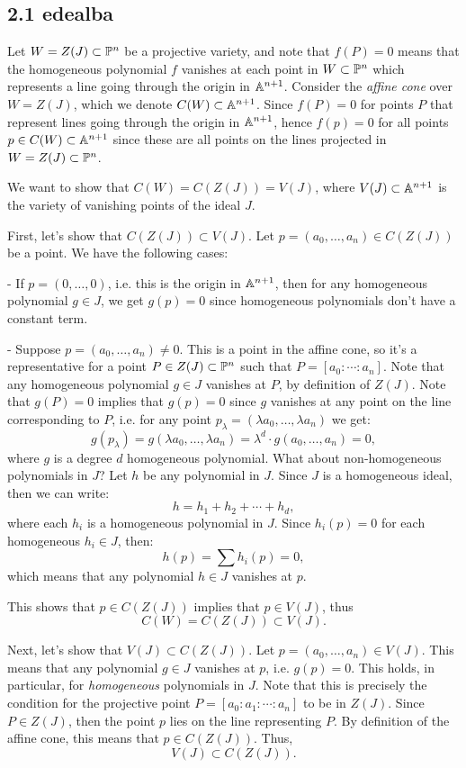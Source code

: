  \subsection*{2.1   {edealba}}

Let $W = Z(J) \subset \P^n$ be a projective variety, and note that $f(P) = 0$ means that the homogeneous polynomial $f$ vanishes at each point in $W \subset \P^n$ which represents a line going through the origin in $\A^{n+1}$. Consider the \emph{affine cone} over $W = Z(J)$, which we denote $C(W) \subset \A^{n+1}$. Since $f(P) = 0$ for points $P$ that represent lines going through the origin in $\A^{n+1}$, hence $f(p) = 0$ for all points $p \in C(W) \subset \A^{n+1}$ since these are all points on the lines projected in $W = Z(J) \subset \P^n$.

We want to show that $C(W) = C(Z(J)) = V(J)$, where $V(J) \subset \A^{n+1}$ is the variety of vanishing points of the ideal $J$.

First, let's show that $C(Z(J)) \subset V(J)$. Let $p = (a_0, \ldots, a_n) \in C(Z(J))$ be a point. We have the following cases:

- If $p = (0, \ldots, 0)$, i.e. this is the origin in $\A^{n+1}$, then for any homogeneous polynomial $g \in J$, we get $g(p) = 0$ since homogeneous polynomials don't have a constant term.

- Suppose $p = (a_0, \ldots, a_n) \neq 0$. This is a point in the affine cone, so it's a representative for a point $P \in Z(J) \subset \P^n$ such that $P = [a_0:\cdots:a_n]$. Note that any homogeneous polynomial $g \in J$ vanishes at $P$, by definition of $Z(J)$. Note that $g(P) = 0$ implies that $g(p) = 0$ since $g$ vanishes at any point on the line corresponding to $P$, i.e. for any point $p_{\lambda} = (\lambda a_0, \ldots, \lambda a_n)$ we get:
$$ g(p_{\lambda}) = g(\lambda a_0, \ldots, \lambda a_n) = \lambda^d \cdot g(a_0, \ldots, a_n) =0, $$
where $g$ is a degree $d$ homogeneous polynomial. What about non-homogeneous polynomials in $J$? Let $h$ be any polynomial in $J$. Since $J$ is a homogeneous ideal, then we can write:
$$ h = h_1 + h_2 + \cdots + h_d, $$
where each $h_i$ is a homogeneous polynomial in $J$. Since $h_i(p) = 0$ for each homogeneous $h_i \in J$, then:
$$ h(p) = \sum h_i(p) = 0, $$
which means that any polynomial $h \in J$ vanishes at $p$.

This shows that $p \in C(Z(J))$ implies that $p \in V(J)$, thus
$$ C(W) = C(Z(J)) \subset V(J). $$

Next, let's show that $V(J) \subset C(Z(J))$. Let $p = (a_0, \ldots, a_n) \in V(J)$. This means that any polynomial $g \in J$ vanishes at $p$, i.e. $g(p) = 0$. This holds, in particular, for \emph{homogeneous} polynomials in $J$. Note that this is precisely the condition for the projective point $P = [a_0: a_1: \cdots : a_n]$ to be in $Z(J)$. Since $P \in Z(J)$, then the point $p$ lies on the line representing $P$. By definition of the affine cone, this means that $p \in C(Z(J))$. Thus,
$$ V(J) \subset C(Z(J)). $$

